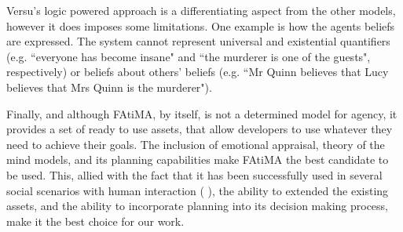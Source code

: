 Versu's logic powered approach is a differentiating aspect from the other models, however it does imposes some limitations.
One example is how the agents beliefs are expressed.
The system cannot represent universal and existential quantifiers (e.g. ``everyone has become insane" and ``the murderer is one of the guests", respectively) or beliefs about others' beliefs (e.g. ``Mr Quinn believes that Lucy believes that Mrs Quinn is the murderer").

Finally, and although \ac{FAtiMA}, by itself, is not a determined model for agency, it provides a set of ready to use assets, that allow developers to use whatever they need to achieve their goals.
The inclusion of emotional appraisal, theory of the mind models, and its planning capabilities make \ac{FAtiMA} the best candidate to be used.
This, allied with the fact that it has been successfully used in several social scenarios with human interaction (\cite{paiva:learning-by-feeling} \cite{rodrigues:i-can-feel-to} \cite{aylett:intercultural-empathy} \cite{correia:sueca}), the ability to extended the existing assets, and the ability to incorporate planning into its decision making process, make it the best choice for our work.

